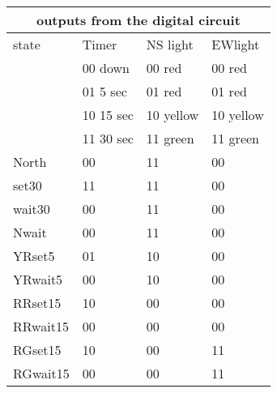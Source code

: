 \begin{enumerate}
\begin{onlysolution}
{                \begin{tabular}{|l|||l|l|l|} \hline
                    \multicolumn{4}{|c|}{outputs from the digital circuit}    \\ \hline \hline
                    state & Timer     & NS light  & EWlight     \\ \hline
                    & 00 down   & 00 red    & 00 red      \\ \hline
                    & 01 5 sec  & 01 red    & 01 red      \\ \hline
                    & 10 15 sec & 10 yellow & 10 yellow   \\ \hline
                    & 11 30 sec & 11 green  & 11 green    \\ \hline \hline
                    North    & 00       & 11          & 00  \\ \hline
                    set30 & 11       & 11          & 00  \\ \hline
                    wait30& 00       & 11          & 00  \\ \hline
                    Nwait    & 00       & 11          & 00  \\ \hline

                    YRset5  & 01       & 10          & 00  \\ \hline
                    YRwait5 & 00       & 10          & 00  \\ \hline

                    RRset15 & 10       & 00          & 00  \\ \hline
                    RRwait15& 00       & 00          & 00  \\ \hline

                    RGset15 & 10       & 00          & 11  \\ \hline
                    RGwait15& 00       & 00          & 11  \\ \hline
                \end{tabular}

}
\end{onlysolution}
\end{enumerate}
